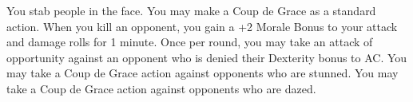 \combatfeat
{You stab people in the face.}
{You may make a Coup de Grace as a standard action.}
{When you kill an opponent, you gain a +2 Morale Bonus to your attack and damage rolls for 1 minute.}
{Once per round, you may take an attack of opportunity against an opponent who is denied their Dexterity bonus to AC.}
{You may take a Coup de Grace action against opponents who are stunned.}
{You may take a Coup de Grace action against opponents who are dazed.}